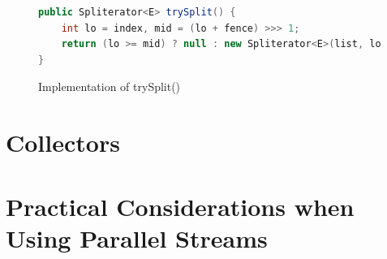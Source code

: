 \documentclass[]{article}
\begin{document}
\begin{figure}[H]
\begin{lstlisting}[language=Java]
public Spliterator<E> trySplit() {
    int lo = index, mid = (lo + fence) >>> 1;
    return (lo >= mid) ? null : new Spliterator<E>(list, lo, index = mid);
}
\end{lstlisting}
\caption{Implementation of trySplit()}
\label{fig:trySplit}
\end{figure}
\section{Collectors}
\section{Practical Considerations when Using Parallel Streams}
\end{document}
